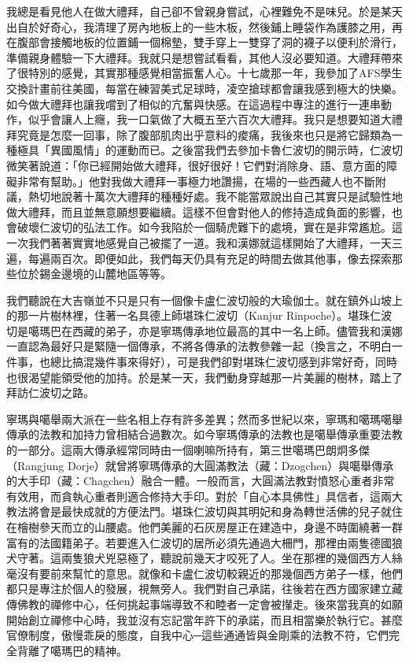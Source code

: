我總是看見他人在做大禮拜，自己卻不曾親身嘗試，心裡難免不是味兒。於是某天出自於好奇心，我清理了房內地板上的一些木板，然後鋪上睡袋作為護膝之用，再在腹部會接觸地板的位置鋪一個棉墊，雙手穿上一雙穿了洞的襪子以便利於滑行，準備親身體驗一下大禮拜。我就只是想嘗試看看，其他人沒必要知道。大禮拜帶來了很特別的感覺，其實那種感覺相當振奮人心。十七歲那一年，我參加了AFS學生交換計畫前往美國，每當在練習美式足球時，凌空搶球都會讓我感到極大的快樂。如今做大禮拜也讓我嚐到了相似的亢奮與快感。在這過程中專注的進行一連串動作，似乎會讓人上癮，我一口氣做了大概五至六百次大禮拜。我只是想要知道大禮拜究竟是怎麼一回事，除了腹部肌肉出乎意料的痠痛，我後來也只是將它歸類為一種極具「異國風情」的運動而已。之後當我們去參加卡魯仁波切的開示時，仁波切微笑著說道：「你已經開始做大禮拜，很好很好！它們對消除身、語、意方面的障礙非常有幫助。」他對我做大禮拜一事極力地讚揚，在場的一些西藏人也不斷附議，熱切地說著十萬次大禮拜的種種好處。我不能當眾說出自己其實只是試驗性地做大禮拜，而且並無意願想要繼續。這樣不但會對他人的修持造成負面的影響，也會破壞仁波切的弘法工作。如今我陷於一個騎虎難下的處境，實在是非常尷尬。這一次我們著著實實地感覺自己被擺了一道。我和漢娜就這樣開始了大禮拜，一天三遍，每遍兩百次。即便如此，我們每天仍具有充足的時間去做其他事，像去探索那些位於錫金邊境的山麓地區等等。

我們聽說在大吉嶺並不只是只有一個像卡盧仁波切般的大瑜伽士。就在鎮外山坡上的那一片樹林裡，住著一名具德上師堪珠仁波切（Kanjur
Rinpoche）。堪珠仁波切是噶瑪巴在西藏的弟子，亦是寧瑪傳承地位最高的其中一名上師。儘管我和漢娜一直認為最好只是緊隨一個傳承，不將各傳承的法教參雜一起（換言之，不明白一件事，也總比搞混幾件事來得好），可是我們卻對堪珠仁波切感到非常好奇，同時也很渴望能領受他的加持。於是某一天，我們動身穿越那一片美麗的樹林，踏上了拜訪仁波切之路。

寧瑪與噶舉兩大派在一些名相上存有許多差異；然而多世紀以來，寧瑪和噶瑪噶舉傳承的法教和加持力曾相結合過數次。如今寧瑪傳承的法教也是噶舉傳承重要法教的一部分。這兩大傳承經常同時由一個喇嘛所持有，第三世噶瑪巴朗炯多傑（Rangjung
Dorje）就曾將寧瑪傳承的大圓滿教法（藏：Dzogchen）與噶舉傳承的大手印（藏：Chagchen）融合一體。一般而言，大圓滿法教對憤怒心重者非常有效用，而貪執心重者則適合修持大手印。對於「自心本具佛性」具信者，這兩大教法將會是最快成就的方便法門。堪珠仁波切與其明妃和身為轉世活佛的兒子就住在檜樹參天而立的山腰處。他們美麗的石灰房屋正在建造中，身邊不時圍繞著一群富有的法國籍弟子。若要進入仁波切的居所必須先通過大柵門，那裡由兩隻德國狼犬守著。這兩隻狼犬兇惡極了，聽說前幾天才咬死了人。坐在那裡的幾個西方人絲毫沒有要前來幫忙的意思。就像和卡盧仁波切較親近的那幾個西方弟子一樣，他們都只是專注於個人的發展，視無旁人。我們對自己承諾，往後若在西方國家建立藏傳佛教的禪修中心，任何挑起事端導致不和睦者一定會被攆走。後來當我真的如願開始創立禪修中心時，我並沒有忘記當年許下的承諾，而且相當樂於執行它。甚麼官僚制度，傲慢乖戾的態度，自我中心─這些通通皆與金剛乘的法教不符，它們完全背離了噶瑪巴的精神。

